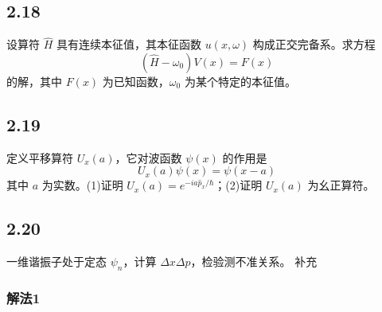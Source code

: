 \subsection{2.18}
设算符 $\hat{H}$ 具有连续本征值，其本征函数 $u(x, \omega)$ 构成正交完备系。求方程
$$(\hat{H} - \omega_0)V(x) = F(x)$$
的解，其中 $F(x)$ 为已知函数，$\omega_0$ 为某个特定的本征值。

\subsection{2.19}
定义平移算符 $U_x(a)$，它对波函数 $\psi(x)$ 的作用是
$$U_x(a)\psi(x) = \psi(x-a)$$
其中 $a$ 为实数。(1)证明 $U_x(a) = e^{-i a \hat{p}_x / \hbar}$；(2)证明 $U_x(a)$ 为幺正算符。

\subsection{2.20}
一维谐振子处于定态 $\psi_n$，计算 $\Delta x \Delta p$，检验测不准关系。
补充

\subsubsection{解法1}

